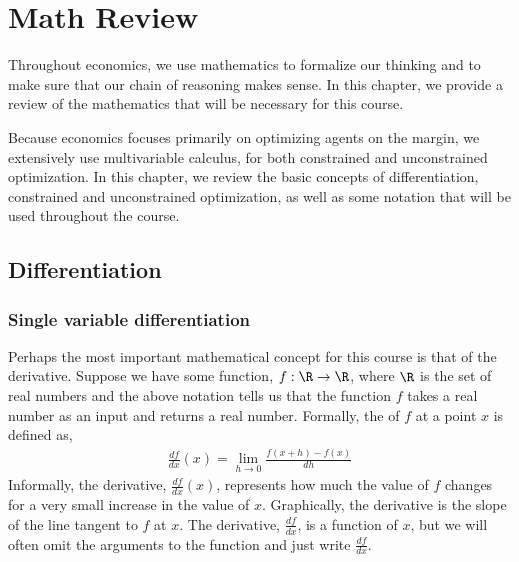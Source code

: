 \chapter{Math Review}
Throughout economics, we use mathematics to formalize our thinking and to make sure that our chain of reasoning makes sense. In this chapter, we provide a review of the mathematics that will be necessary for this course.

Because economics focuses primarily on optimizing agents on the margin, we extensively use multivariable calculus, for both constrained and unconstrained optimization. In this chapter, we review the basic concepts of differentiation, constrained and unconstrained optimization, as well as some notation that will be used throughout the course. 

\section{Differentiation}
\subsection*{Single variable differentiation}
Perhaps the most important mathematical concept for this course is that of the derivative. Suppose we have some function, $f: \R \to \R$, where $\R$ is the set of real numbers and the above notation tells us that the function $f$ takes a real number as an input and returns a real number. Formally, the  of $f$ at a point $x$ is defined as,
\begin{align*}
    \frac{df}{dx}(x) = \lim_{h \to 0} \frac{f(x + h) - f(x)}{dh}
\end{align*}
Informally, the derivative, $\frac{df}{dx}(x)$, represents how much the value of $f$ changes for a very small increase in the value of $x$. Graphically, the derivative is the slope of the line tangent to $f$ at $x$. The derivative, $\frac{df}{dx}$, is a function of $x$, but we will often omit the arguments to the function and just write $\frac{df}{dx}$. 

